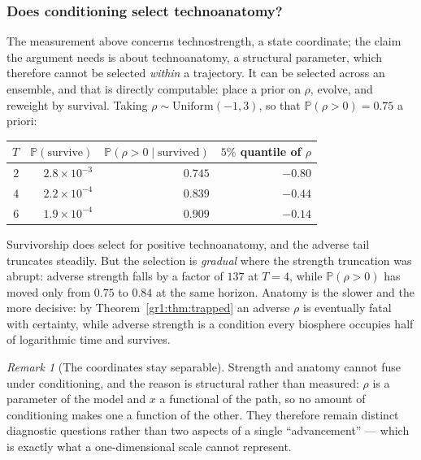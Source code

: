 \documentclass[11pt]{article}
\numberwithin{equation}{section}
\theoremstyle{plain}
\theoremstyle{definition}
\theoremstyle{remark}
\newtheorem{remark}[theorem]{Remark}
\newcommand{\PP}{\mathbb{P}}
\begin{document}
\subsubsection{Does conditioning select technoanatomy?}
\label{gr:subsub:anatsel}

The measurement above concerns technostrength, a state coordinate; the
claim the argument needs is about technoanatomy, a structural parameter,
which therefore cannot be selected \emph{within} a trajectory. It can be
selected across an ensemble, and that is directly computable: place a
prior on $\rho$, evolve, and reweight by survival. Taking
$\rho\sim\mathrm{Uniform}(-1,3)$, so that $\PP(\rho>0)=0.75$ a priori:

\begin{center}\small
\begin{tabular}{@{}rrrr@{}}
\toprule
$T$ & $\PP(\text{survive})$ & $\PP(\rho>0\mid\text{survived})$ &
$5\%$ quantile of $\rho$\\
\midrule
$2$ & $2.8\times10^{-3}$ & $0.745$ & $-0.80$\\
$4$ & $2.2\times10^{-4}$ & $0.839$ & $-0.44$\\
$6$ & $1.9\times10^{-4}$ & $0.909$ & $-0.14$\\
\bottomrule
\end{tabular}
\end{center}

\noindent Survivorship does select for positive technoanatomy, and the
adverse tail truncates steadily. But the selection is \emph{gradual}
where the strength truncation was abrupt: adverse strength falls by a
factor of $137$ at $T=4$, while $\PP(\rho>0)$ has moved only from
$0.75$ to $0.84$ at the same horizon. Anatomy is the slower and the more
decisive: by Theorem~\ref{gr1:thm:trapped} an adverse $\rho$ is
eventually fatal with certainty, while adverse strength is a condition
every biosphere occupies half of logarithmic time and survives.

\begin{remark}[The coordinates stay separable]\label{gr:rem:separable}
Strength and anatomy cannot fuse under conditioning, and the reason is
structural rather than measured: $\rho$ is a parameter of the model and
$x$ a functional of the path, so no amount of conditioning makes one a
function of the other. They therefore remain distinct diagnostic
questions rather than two aspects of a single ``advancement'' --- which
is exactly what a one-dimensional scale cannot represent.
\end{remark}
\end{document}
